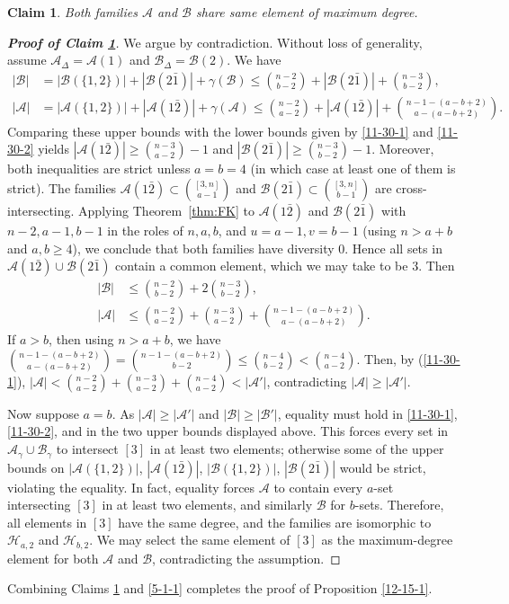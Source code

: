 \documentclass[11pt]{article}
\newcommand{\m}{\mathcal}
\newtheorem{claim}[theorem]{Claim}
\begin{document}
\begin{claim}\label{5-1-2}
Both families $\m A$ and $\m B$ share same element of maximum degree.
\end{claim}
\begin{proof}[\bf{Proof of Claim \ref{5-1-2}}]
We argue by contradiction. Without loss of generality, assume $\m A_\Delta = \m A(1)$ and $\m B_\Delta = \m B(2)$. 
We have
\begin{align*}
|\m B|&=|\m B(\{1,2\})|+|\m B(2 \bar 1)|+\gamma(\m B)\le {n-2\choose b-2}+|\m B(2 \bar 1)|+{n-3\choose b-2},\\
|\m A|&=|\m A(\{1,2\})|+|\m A(1 \bar 2)|+\gamma(\m A)\le {n-2\choose a-2}+|\m A(1 \bar 2)|+{n-1-(a-b+2)\choose a-(a-b+2)}.
\end{align*}
Comparing these upper bounds with the lower bounds given by \eqref{11-30-1} and \eqref{11-30-2} yields $|\m A(1\bar 2)|\ge {n-3\choose a-2}-1$ and $|\m B (2\bar{1})|\ge {n-3\choose b-2}-1.$ 
Moreover, both inequalities are strict unless $a=b=4$ (in which case at least one of them is strict).
The families $\m A(1\bar 2)\subset {[3,n]\choose a-1}$ and $\m B(2\bar 1)\subset {[3,n]\choose b-1}$ are cross-intersecting.
Applying Theorem~\ref{thm:FK} to $\m A(1\bar 2)$ and $\m B(2\bar 1)$ with $n-2, a-1, b-1$ in the roles of $n, a, b$, and $u=a-1, v=b-1$ (using $n>a+b$ and $a,b\ge 4$), we conclude that both families have diversity $0$. 
Hence all sets in $\m A(1\bar 2)\cup \m B(2\bar 1)$ contain a common element, which we may take to be $3$. Then 
\begin{align*}
    |\m B|&\le {n-2\choose b-2}+2{n-3\choose b-2},\\
    |\m A|&\le {n-2\choose a-2}+{n-3\choose a-2}+{n-1-(a-b+2)\choose a-(a-b+2)}.
\end{align*}
If $a>b$, then using $n>a+b$, we have 
${n-1-(a-b+2)\choose a-(a-b+2)}={n-1-(a-b+2)\choose b-2}\le {n-4\choose b-2}<{n-4\choose a-2}$. 
Then, by (\ref{11-30-1}), 
$|\m A|<{n-2\choose a-2}+{n-3\choose a-2}+{n-4\choose a-2}< |\m A'|$, contradicting $|\m A|\ge |\m A'|$.  

Now suppose $a=b$. 
As $|\m A|\ge |\m A'|$ and $ |\m B|\ge |\m B'|$, equality must hold in \eqref{11-30-1}, \eqref{11-30-2}, and in the two upper bounds displayed above.
This forces every set in $\m A_\gamma \cup \m B_\gamma$ to intersect $[3]$ in at least two elements; otherwise some of the upper bounds on $|\m A(\{1,2\})|$, $|\m A(1\bar 2)|$, $|\m B(\{1,2\})|$, $|\m B(2\bar 1)|$ would be strict, violating the equality. 
In fact, equality forces $\m A$ to contain every $a$-set  intersecting $[3]$ in at least two elements, and similarly $\m B$ for $b$-sets. 
Therefore, all elements in $[3]$ have the same degree, and the families are isomorphic to $\m H_{a,2}$ and $\m H_{b,2}$. 
We may select the same element of $[3]$ as the maximum-degree element for both $\m A$ and $\m B$, contradicting the assumption.
\end{proof}  
Combining Claims \ref{5-1-2} and \ref{5-1-1} completes the proof of Proposition \ref{12-15-1}.
\end{document}
